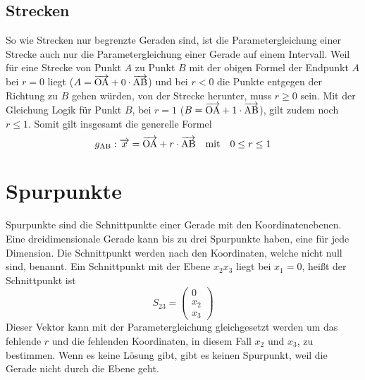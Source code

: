 \documentclass{article}
\begin{document}
\subsection{Strecken} 
\begin{wrapfigure}{l}{6cm}
  \centering
\end{wrapfigure}  
So wie Strecken nur begrenzte Geraden sind, ist die Parametergleichung einer Strecke auch nur die Parametergleichung einer Gerade auf einem Intervall. Weil für eine Strecke von Punkt $A$ zu Punkt $B$ mit der obigen Formel der Endpunkt $A$ bei $r=0$ liegt ($A = \overrightarrow{\mathrm{OA}} + 0 \cdot \overrightarrow{\mathrm{AB}}$) und bei $r < 0$ die Punkte entgegen der Richtung zu $B$ gehen würden, von der Strecke herunter, muss $r \geq 0$ sein. Mit der Gleichung Logik für Punkt $B$, bei $r=1$ ($B = \overrightarrow{\mathrm{OA}} + 1 \cdot \overrightarrow{\mathrm{AB}}$), gilt zudem noch $r \leq 1$. Somit gilt insgesamt die generelle Formel 
\[
 g_{\mathrm{AB}}: \overrightarrow{x} = \overrightarrow{\mathrm{OA}} + r \cdot \overrightarrow{\mathrm{AB}}
 \quad \text{mit} \quad
 0 \leq r \leq 1 
\]
 
\section{Spurpunkte}
Spurpunkte sind die Schnittpunkte einer Gerade mit den Koordinatenebenen.
Eine dreidimensionale Gerade kann bis zu drei Spurpunkte haben, eine für jede Dimension. Die Schnittpunkt werden nach den Koordinaten, welche nicht null sind, benannt. \newline
Ein Schnittpunkt mit der Ebene $x_2x_3$ liegt bei $x_1 = 0$, heißt der Schnittpunkt ist
\[
 S_{23} = \begin{pmatrix} 0 \\ x_2 \\ x_3 \end{pmatrix} 
\]
Dieser Vektor kann mit der Parametergleichung gleichgesetzt werden um das fehlende $r$ und die fehlenden Koordinaten, in diesem Fall $x_2$ und $x_3$, zu bestimmen. Wenn es keine Lösung gibt, gibt es keinen Spurpunkt, weil die Gerade nicht durch die Ebene geht.
 
\end{document}
